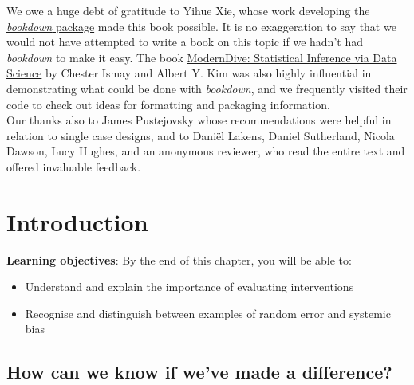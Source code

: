 \documentclass{krantz}
\begin{document}
We owe a huge debt of gratitude to Yihue Xie, whose work developing the \href{https://bookdown.org/}{\emph{bookdown} package} made this book possible. It is no exaggeration to say that we would not have attempted to write a book on this topic if we hadn't had \emph{bookdown} to make it easy. The book \href{https://moderndive.com/}{ModernDive: Statistical Inference via Data Science} by Chester Ismay and Albert Y. Kim was also highly influential in demonstrating what could be done with \emph{bookdown}, and we frequently visited their code to check out ideas for formatting and packaging information.\\
Our thanks also to James Pustejovsky whose recommendations were helpful in relation to single case designs, and to Daniël Lakens, Daniel Sutherland, Nicola Dawson, Lucy Hughes, and an anonymous reviewer, who read the entire text and offered invaluable feedback.



\listoffigures
\listoftables

\mainmatter

\hypertarget{intro}{%
\chapter{Introduction}\label{intro}}

\textbf{Learning objectives}: By the end of this chapter, you will be able to:

\begin{itemize}
\item
  Understand and explain the importance of evaluating interventions
\item
  Recognise and distinguish between examples of random error and systemic bias
\end{itemize}

\hypertarget{how-can-we-know-if-weve-made-a-difference}{%
\section{How can we know if we've made a difference?}\label{how-can-we-know-if-weve-made-a-difference}}
\end{document}
